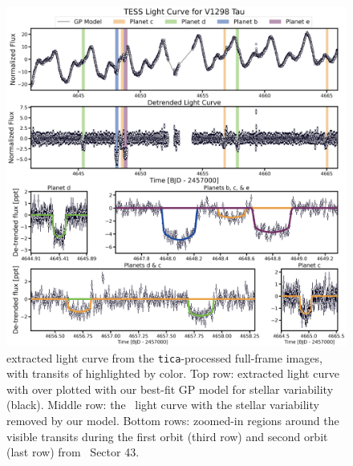 \documentclass[twocolumn]{aastex631}
\begin{document}
\begin{figure}[!ht]
\begin{center}
\includegraphics[width=\textwidth,trim={0.25cm 0 0 0}]{static/lightcurve.pdf}
\caption{\sname extracted light curve from the \texttt{tica}-processed full-frame images, with transits of \allplanets highlighted by color. Top row: extracted light curve with over plotted with our best-fit GP model for stellar variability (black). Middle row: the \tess\ light curve with the stellar variability removed by our model. Bottom rows: zoomed-in regions around the visible transits during the first orbit (third row) and second orbit (last row) from \tess\ Sector 43. \label{fig:transits}}
\end{center}
\end{figure}
\end{document}
